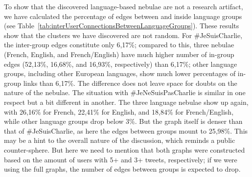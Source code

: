 To show that the discovered language-based nebulae are not a research artifact, we have calculated the percentage of edges between and inside language groups (see Table~\cref{tab:interUserConnectionsBetweenLanguageGroups}). These results show that the clusters we have discovered are not random. For \#JeSuisCharlie, the inter-group edges constitute only 6,17\%; compared to this, three nebulae (French, English, and French/English) have much higher number of in-group edges (52,13\%, 16,68\%, and 16,93\%, respectively) than 6,17\%; other language groups, including other European languages, show much lower percentages of in-group links than 6,17\%. The difference does not leave space for doubts on the nature of the nebulae. The situation with \#JeNeSuisPasCharlie is similar in one respect but a bit different in another. The three language nebulae show up again, with 26,16\% for French, 22,41\% for English, and 18,84\% for French/English, while other language groups drop below 3\%. But the graph itself is denser than that of \#JeSuisCharlie, as here the edges between groups mount to 25,98\%. This may be a hint to the overall nature of the discussion, which reminds a public counter-sphere. But here we need to mention that both graphs were constructed based on the amount of users with 5+ and 3+ tweets, respectively; if we were using the full graphs, the number of edges between groups is expected to drop.

